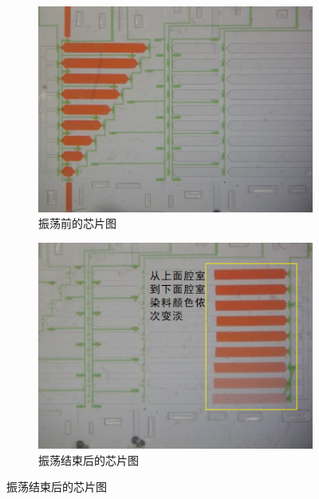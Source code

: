 	\begin{figure}[!htp]
	\centering
	  \begin{subfigure}{0.45\textwidth}
		\centering
		\includegraphics[width=1\linewidth]{figure/chap2/before.jpg}
		\caption{振荡前的芯片图 }
		\label{fig:before}   
	  \end{subfigure}
		\hspace{1em}
	  \begin{subfigure}{0.45\textwidth}
		\centering
		\includegraphics[width=1\linewidth]{figure/chap2/after.png}
		\caption{振荡结束后的芯片图}
		\label{fig:after}
	  \end{subfigure}
	  \label{fig:oscillation}
	\end{figure}

